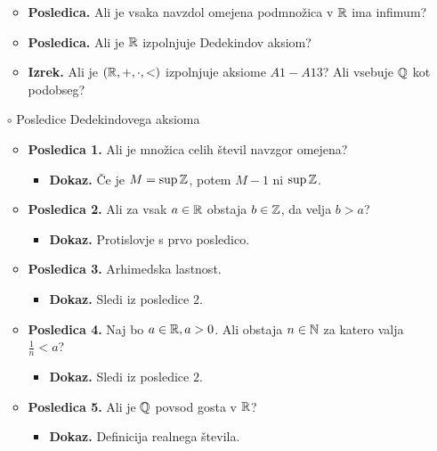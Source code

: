 \begin{enumerate}
\begin{itemize}
\begin{itemize}
        \end{itemize}
        \item \colorbox{orange!30}{\textbf{Posledica.}} Ali je vsaka navzdol omejena podmnožica v $\mathbb{R}$ ima infimum?
        \item \colorbox{orange!30}{\textbf{Posledica.}} Ali je $\mathbb{R}$ izpolnjuje Dedekindov aksiom?
        \item \colorbox{blue!30}{\textbf{Izrek.}} Ali je $(\mathbb{R}, +, \cdot, <)$ izpolnjuje aksiome $A1-A13$? Ali vsebuje $\mathbb{Q}$ kot podobseg?
    \end{itemize}

    \item[$\circ$] Posledice Dedekindovega aksioma
    \begin{itemize}
        \item \colorbox{orange!30}{\textbf{Posledica 1.}} Ali je množica celih števil navzgor omejena?
        \begin{itemize}
            \item \colorbox{green!30}{\textbf{Dokaz.}} Če je $M = \sup \mathbb{Z}$, potem $M-1$ ni $\sup \mathbb{Z}$.
        \end{itemize}
        \item \colorbox{orange!30}{\textbf{Posledica 2.}} Ali za vsak $a \in \mathbb{R}$ obstaja $b \in \mathbb{Z}$, da velja $b>a$?
        \begin{itemize}
            \item \colorbox{green!30}{\textbf{Dokaz.}} Protislovje s prvo posledico.
        \end{itemize}
        \item \colorbox{orange!30}{\textbf{Posledica 3.}} Arhimedska lastnost.
        \begin{itemize}
            \item \colorbox{green!30}{\textbf{Dokaz.}} Sledi iz posledice $2$.
        \end{itemize}
        \item \colorbox{orange!30}{\textbf{Posledica 4.}} Naj bo $a \in \mathbb{R}, a>0$. Ali obstaja $n \in \mathbb{N}$ za katero valja $\frac{1}{n} < a$?
        \begin{itemize}
            \item \colorbox{green!30}{\textbf{Dokaz.}} Sledi iz posledice $2$.
        \end{itemize}
        \item \colorbox{orange!30}{\textbf{Posledica 5.}} Ali je $\mathbb{Q}$ povsod gosta v $\mathbb{R}$?
        \begin{itemize}
            \item \colorbox{green!30}{\textbf{Dokaz.}} Definicija realnega števila.
        \end{itemize}
    \end{itemize}


\end{enumerate}
